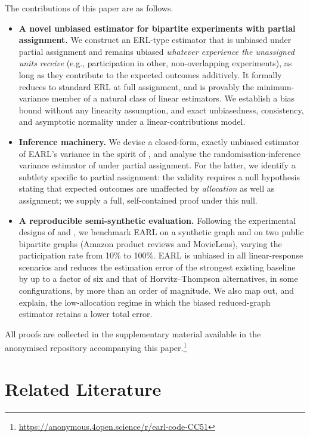 \documentclass[sigconf,anonymous,review]{acmart}
\newcounter{assumption}
\begin{document}
The contributions of this paper are as follows.
\begin{itemize}
    \item \textbf{A novel unbiased estimator for bipartite experiments with partial assignment.} We construct an ERL-type estimator that is unbiased under partial assignment and remains ubiased \emph{whatever experience the unassigned units receive} (e.g., participation in other, non-overlapping experiments), as long as they contribute to the expected outcomes additively. It formally reduces to standard ERL at full assignment, and is provably the minimum-variance member of a natural class of linear estimators. We establish a bias bound without any linearity assumption, and exact unbiasedness, consistency, and asymptotic normality under a linear-contributions model.
    \item \textbf{Inference machinery.} We devise a closed-form, exactly unbiased estimator of EARL's variance in the spirit of \citet{harshaw2023erl}, and analyse the randomisation-inference variance estimator of \citet{shi2025scalableanalysisbipartiteexperiments} under partial assignment. For the latter, we identify a subtlety specific to partial assignment: the validity requires a null hypothesis stating that expected outcomes are unaffected by \emph{allocation} as well as assignment; we supply a full, self-contained proof under this null.
    \item \textbf{A reproducible semi-synthetic evaluation.} Following the experimental designs of \citet{doudchenko2020causal} and \citet{harshaw2023erl}, we benchmark EARL on a synthetic graph and on two public bipartite graphs (Amazon product reviews and MovieLens), varying the participation rate from 10\% to 100\%. EARL is unbiased in all linear-response scenarios and reduces the estimation error of the strongest existing baseline by up to a factor of six and that of Horvitz--Thompson alternatives, in some configurations, by more than an order of magnitude. We also map out, and explain, the low-allocation regime in which the biased reduced-graph estimator retains a lower total error.
\end{itemize}

All proofs are collected in the supplementary material available in the anonymised repository accompanying this paper.\footnote{\url{https://anonymous.4open.science/r/earl-code-CC51}}

\section{Related Literature}\label{sec:literature}
\end{document}
